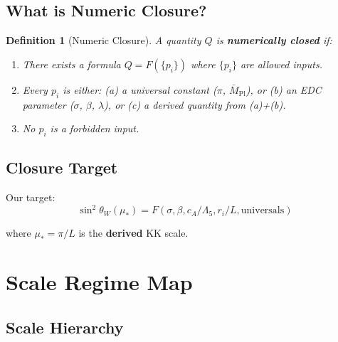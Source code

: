 \documentclass[11pt,a4paper]{article}
\newtheorem{definition}{Definition}[section]
\begin{document}
\subsection{What is Numeric Closure?}
\label{subsec:numeric-closure-def}

\begin{definition}[Numeric Closure]
\label{def:numeric-closure}
A quantity $Q$ is \textbf{numerically closed} if:
\begin{enumerate}
\item There exists a formula $Q = F(\{p_i\})$ where $\{p_i\}$ are allowed inputs.
\item Every $p_i$ is either: (a) a universal constant ($\pi$, $\bar{M}_{\text{Pl}}$), or
      (b) an EDC parameter ($\sigma$, $\beta$, $\lambda$), or (c) a derived quantity from (a)+(b).
\item No $p_i$ is a forbidden input.
\end{enumerate}
\end{definition}

\subsection{Closure Target}
\label{subsec:closure-target}

Our target:
\begin{equation}
\label{eq:closure-target}
\boxed{\sin^2\theta_W(\mu_*) = F(\sigma, \beta, c_A/\Lambda_5, r_i/L, \text{universals})}
\end{equation}

where $\mu_* = \pi/L$ is the \textbf{derived} KK scale.

\section{Scale Regime Map}
\label{sec:scale-map}

\subsection{Scale Hierarchy}
\label{subsec:scale-hierarchy}
\end{document}

